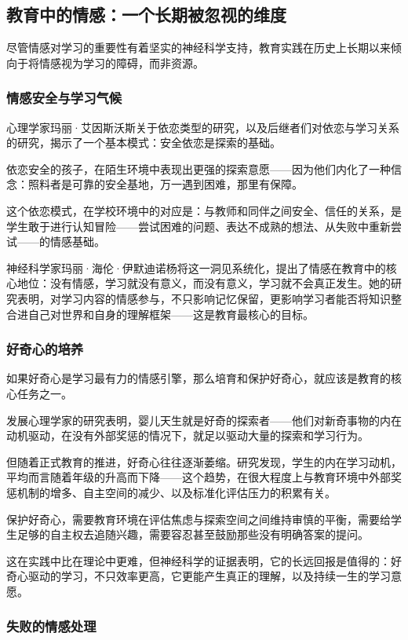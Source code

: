 \documentclass[11pt]{article}
\begin{document}
\subsection{教育中的情感：一个长期被忽视的维度}
\label{sec:orge45448d}

尽管情感对学习的重要性有着坚实的神经科学支持，教育实践在历史上长期以来倾向于将情感视为学习的障碍，而非资源。
\subsubsection{情感安全与学习气候}
\label{sec:orgaa0304d}

心理学家玛丽·艾因斯沃斯关于依恋类型的研究，以及后继者们对依恋与学习关系的研究，揭示了一个基本模式：安全依恋是探索的基础。

依恋安全的孩子，在陌生环境中表现出更强的探索意愿——因为他们内化了一种信念：照料者是可靠的安全基地，万一遇到困难，那里有保障。

这个依恋模式，在学校环境中的对应是：与教师和同伴之间安全、信任的关系，是学生敢于进行认知冒险——尝试困难的问题、表达不成熟的想法、从失败中重新尝试——的情感基础。

神经科学家玛丽·海伦·伊默迪诺杨将这一洞见系统化，提出了情感在教育中的核心地位：没有情感，学习就没有意义，而没有意义，学习就不会真正发生。她的研究表明，对学习内容的情感参与，不只影响记忆保留，更影响学习者能否将知识整合进自己对世界和自身的理解框架——这是教育最核心的目标。
\subsubsection{好奇心的培养}
\label{sec:org93dcdc5}

如果好奇心是学习最有力的情感引擎，那么培育和保护好奇心，就应该是教育的核心任务之一。

发展心理学家的研究表明，婴儿天生就是好奇的探索者——他们对新奇事物的内在动机驱动，在没有外部奖惩的情况下，就足以驱动大量的探索和学习行为。

但随着正式教育的推进，好奇心往往逐渐萎缩。研究发现，学生的内在学习动机，平均而言随着年级的升高而下降——这个趋势，在很大程度上与教育环境中外部奖惩机制的增多、自主空间的减少、以及标准化评估压力的积累有关。

保护好奇心，需要教育环境在评估焦虑与探索空间之间维持审慎的平衡，需要给学生足够的自主权去追随兴趣，需要容忍甚至鼓励那些没有明确答案的提问。

这在实践中比在理论中更难，但神经科学的证据表明，它的长远回报是值得的：好奇心驱动的学习，不只效率更高，它更能产生真正的理解，以及持续一生的学习意愿。
\subsubsection{失败的情感处理}
\label{sec:org0b24ebc}
\end{document}
